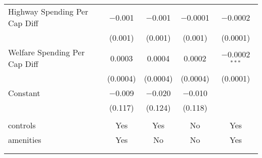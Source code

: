\begin{table}[!htbp]
\begin{tabular}{@{\extracolsep{5pt}}lcccc}
  Highway Spending Per Cap Diff & $-$0.001 & $-$0.001 & $-$0.0001 & $-$0.0002 \\ 
  & (0.001) & (0.001) & (0.001) & (0.0001) \\ 
  Welfare Spending Per Cap Diff & 0.0003 & 0.0004 & 0.0002 & $-$0.0002$^{***}$ \\ 
  & (0.0004) & (0.0004) & (0.0004) & (0.0001) \\ 
  Constant & $-$0.009 & $-$0.020 & $-$0.010 &  \\ 
  & (0.117) & (0.124) & (0.118) &  \\ 
 \hline \\[-1.8ex] 
controls & Yes & Yes & No & Yes \\ 
amenities & Yes & No & No & Yes \\ 
\hline \\[-1.8ex] 
\hline 
\hline \\[-1.8ex] 
\end{tabular} 
\end{table} 
